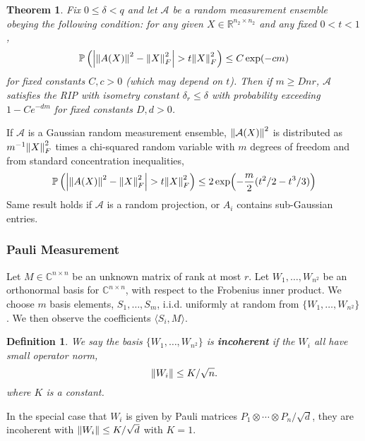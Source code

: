 \documentclass[10pt]{article}  %
\theoremstyle{plain}
\newtheorem{theorem}{Theorem}[section]
\newtheorem{definition}[thm]{Definition}
\numberwithin{equation}{section}
\newcommand{\innerp}[1]{\langle{#1}\rangle}
\def\mA{\mathcal{A}}
\def\R{\mathbb{R}}
\def\C{\mathbb{C}}
\begin{document}
\begin{theorem}\cite[Theorem 2.3]{candesTightOracleBounds}
	Fix $0 \leq \delta < q$ and let $\mA$ be a random measurement ensemble obeying the following condition: for any given $X \in \R^{n_2 \times n_2}$ and any fixed $0 < t < 1$, 
	\begin{equation}
		\mathbb{P}\left(\abs{\norm{A(X)}^2 - \norm{X}^2_F} > t \norm{X}^2_F\right) \leq C\exp(-cm)
	\end{equation}
	for fixed constants $C, c > 0$ (which may depend on $t$). Then if $m \geq Dnr$, $\mA$ satisfies the RIP with isometry constant $\delta_r \leq \delta$ with probability exceeding $1 - Ce^{-dm}$ for fixed constants $D, d >0$. 
\end{theorem}

If $\mA$ is a Gaussian random measurement ensemble, $\norm{\mA(X)}^2$ is distributed as $m^{-1}\norm{X}^2_F$ times a chi-squared random variable with $m$ degrees of freedom and from standard concentration inequalities, \\
\begin{equation}
	\mathbb{P}\left(\abs{\norm{A(X)}^2 - \norm{X}^2_F} > t \norm{X}^2_F\right) \leq 2\exp(-\frac{m}{2}(t^2/2 - t^3/3))
\end{equation}
Same result holds if $\mA$ is a random projection, or $A_i$ contains sub-Gaussian entries.

\subsubsection{Pauli Measurement}
Let $M\in \C^{n \times n}$ be an unknown matrix of rank at most $r$. Let $W_1, \dots, W_{n^2}$ be an orthonormal basis for $\C^{n \times n}$, with respect to the Frobenius inner product. We choose $m$ basis elements, $S_1, \dots, S_m$, i.i.d. uniformly at random from $\{W_1, \dots, W_{n^2}\}$. We then observe the coefficients $\innerp{S_i, M}$. 

\begin{definition}
	We say the basis $\{W_1, \dots, W_{n^2}\}$ is \textbf{incoherent} if the $W_i$ all have small operator norm, \\
	\begin{equation}
		\norm{W_i} \leq K/\sqrt{n}.
	\end{equation}
	where $K$ is a constant. 
\end{definition}

In the special case that $W_i$ is given by Pauli matrices $P_1 \otimes \cdots \otimes P_n/\sqrt{d}$, they are incoherent with $\norm{W_i} \leq K/\sqrt d$ with $K = 1$. 
\end{document}
